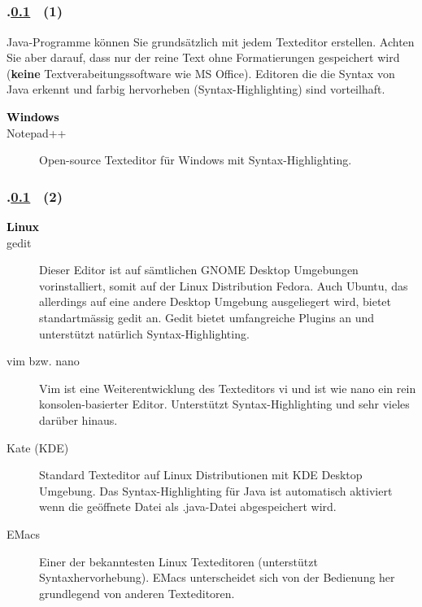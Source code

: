 \subsection{\stitle}\label{S:Editor}
\begin{frame}[t]%
  \frametitle{\kap.\ref{S:Editor} \stitle\ (1)}%
\medskip

Java-Programme k\"onnen Sie grunds\"atzlich mit jedem Texteditor erstellen.
Achten Sie aber darauf, dass nur der reine Text ohne Formatierungen gespeichert wird (\textbf{keine} Textverabeitungssoftware wie MS Office).
Editoren die die Syntax von Java erkennt und farbig hervorheben (Syntax-Highlighting) sind vorteilhaft.
\medskip

\begin{description}
  \item[\textcolor{black}{\textbf{Windows}}]
  \item[Notepad++] Open-source Texteditor f\"ur Windows mit Syntax-Highlighting.
\end{description}
\end{frame}


\begin{frame}[t]%
  \frametitle{\kap.\ref{S:Editor} \stitle\ (2)}%

\begin{description}
  \item[\textcolor{black}{\textbf{Linux}}]
  \item[gedit] Dieser Editor ist auf s\"amtlichen GNOME Desktop Umgebungen vorinstalliert, somit auf der Linux Distribution Fedora.
    Auch Ubuntu, das allerdings auf eine andere Desktop Umgebung ausgeliegert wird, bietet standartm\"assig gedit an.
    Gedit bietet umfangreiche Plugins an und unterst\"utzt nat\"urlich Syntax-Highlighting.
  \item[vim bzw. nano] Vim ist eine Weiterentwicklung des Texteditors vi und ist wie nano ein rein konsolen-basierter Editor.
    Unterst\"utzt Syntax-Highlighting und sehr vieles dar\"uber hinaus.
  \item[Kate (KDE)] Standard Texteditor auf Linux Distributionen mit KDE Desktop Umgebung.
      Das Syntax-Highlighting f\"ur Java ist automatisch aktiviert wenn die ge\"offnete Datei als .java-Datei abgespeichert wird.
  \item[EMacs] Einer der bekanntesten Linux Texteditoren (unterst\"utzt Syntaxhervorhebung).
      EMacs unterscheidet sich von der Bedienung her grundlegend von anderen Texteditoren.
\end{description}
\end{frame}


